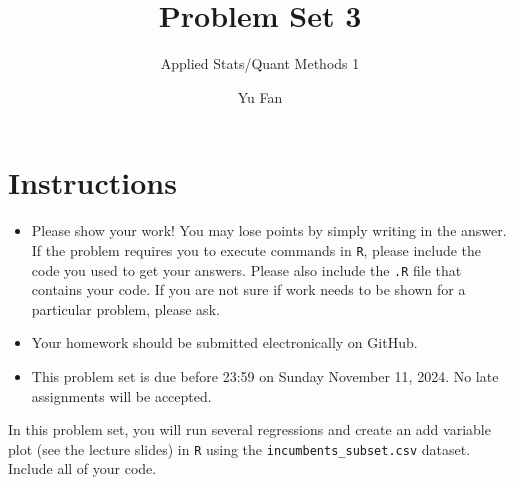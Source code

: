 \documentclass[12pt,letterpaper]{article}
\title{Problem Set 3}
\date{Yu Fan}
\author{Applied Stats/Quant Methods 1}
\begin{document}
	\maketitle
	\section*{Instructions}
	\begin{itemize}
		\item Please show your work! You may lose points by simply writing in the answer. If the problem requires you to execute commands in \texttt{R}, please include the code you used to get your answers. Please also include the \texttt{.R} file that contains your code. If you are not sure if work needs to be shown for a particular problem, please ask.
	\item Your homework should be submitted electronically on GitHub.
	\item This problem set is due before 23:59 on Sunday November 11, 2024. No late assignments will be accepted.

	\end{itemize}

		\vspace{.25cm}
	
\noindent In this problem set, you will run several regressions and create an add variable plot (see the lecture slides) in \texttt{R} using the \texttt{incumbents\_subset.csv} dataset. Include all of your code.

	\vspace{.5cm}
\end{document}
